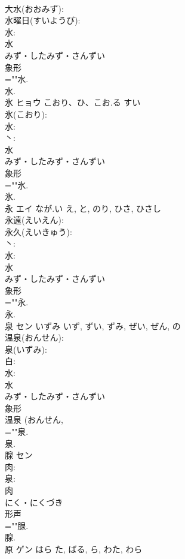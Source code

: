 \documentclass[8pt]{extreport}
\begin{document}
\begin{CJK}{UTF8}{min}
\\	大水(おおみず): 
\\	水曜日(すいようび): 
\\	水: 
\\	水	
\\	みず・したみず・さんずい	
\\	象形 
\\	=""水.
\\	水.
\\	氷	ヒョウ	こおり、ひ、こお.る	すい	
\\	氷(こおり): 
\\	水: 
\\	丶: 
\\	水	
\\	みず・したみず・さんずい	
\\	象形 
\\	=""氷.
\\	氷.
\\	永	エイ	なが.い	え, と, のり, ひさ, ひさし	
\\	永遠(えいえん): 
\\	永久(えいきゅう): 
\\	丶: 
\\	水: 
\\	水	
\\	みず・したみず・さんずい	
\\	象形 
\\	=""永.
\\	永.
\\	泉	セン	いずみ	いず, ずい, ずみ, ぜい, ぜん, の	
\\	温泉(おんせん): 
\\	泉(いずみ): 
\\	白: 
\\	水: 
\\	水	
\\	みず・したみず・さんずい	
\\	象形 
\\	温泉 (おんせん, 
\\	=""泉.
\\	泉.
\\	腺	セン			
\\	肉: 
\\	泉: 
\\	肉	
\\	にく・にくづき	
\\	形声 
\\	=""腺.
\\	腺.
\\	原	ゲン	はら	た, ばる, ら, わた, わら	

\end{CJK}
\end{document}

